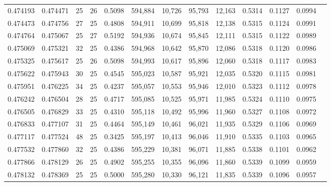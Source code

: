 \begin{tabular}{rrrrrrrrrrrrr}
0.474193 & 0.474471 &    25 &  26 &                                     0.5098 & 594,884 &  10,726 &  95,793 &  12,163 & 0.5314 & 0.1127 & 0.0994 \\
0.474473 & 0.474756 &    27 &  25 &                                     0.4808 & 594,911 &  10,699 &  95,818 &  12,138 & 0.5315 & 0.1124 & 0.0991 \\
0.474764 & 0.475067 &    25 &  27 &                                     0.5192 & 594,936 &  10,674 &  95,845 &  12,111 & 0.5315 & 0.1122 & 0.0989 \\
0.475069 & 0.475321 &    32 &  25 &                                     0.4386 & 594,968 &  10,642 &  95,870 &  12,086 & 0.5318 & 0.1120 & 0.0986 \\
0.475325 & 0.475617 &    25 &  26 &                                     0.5098 & 594,993 &  10,617 &  95,896 &  12,060 & 0.5318 & 0.1117 & 0.0983 \\
0.475622 & 0.475943 &    30 &  25 &                                     0.4545 & 595,023 &  10,587 &  95,921 &  12,035 & 0.5320 & 0.1115 & 0.0981 \\
0.475951 & 0.476225 &    34 &  25 &                                     0.4237 & 595,057 &  10,553 &  95,946 &  12,010 & 0.5323 & 0.1112 & 0.0978 \\
0.476242 & 0.476504 &    28 &  25 &                                     0.4717 & 595,085 &  10,525 &  95,971 &  11,985 & 0.5324 & 0.1110 & 0.0975 \\
0.476505 & 0.476829 &    33 &  25 &                                     0.4310 & 595,118 &  10,492 &  95,996 &  11,960 & 0.5327 & 0.1108 & 0.0972 \\
0.476833 & 0.477107 &    31 &  25 &                                     0.4464 & 595,149 &  10,461 &  96,021 &  11,935 & 0.5329 & 0.1106 & 0.0969 \\
0.477117 & 0.477524 &    48 &  25 &                                     0.3425 & 595,197 &  10,413 &  96,046 &  11,910 & 0.5335 & 0.1103 & 0.0965 \\
0.477532 & 0.477860 &    32 &  25 &                                     0.4386 & 595,229 &  10,381 &  96,071 &  11,885 & 0.5338 & 0.1101 & 0.0962 \\
0.477866 & 0.478129 &    26 &  25 &                                     0.4902 & 595,255 &  10,355 &  96,096 &  11,860 & 0.5339 & 0.1099 & 0.0959 \\
0.478132 & 0.478369 &    25 &  25 &                                     0.5000 & 595,280 &  10,330 &  96,121 &  11,835 & 0.5339 & 0.1096 & 0.0957 \\

\end{tabular}
